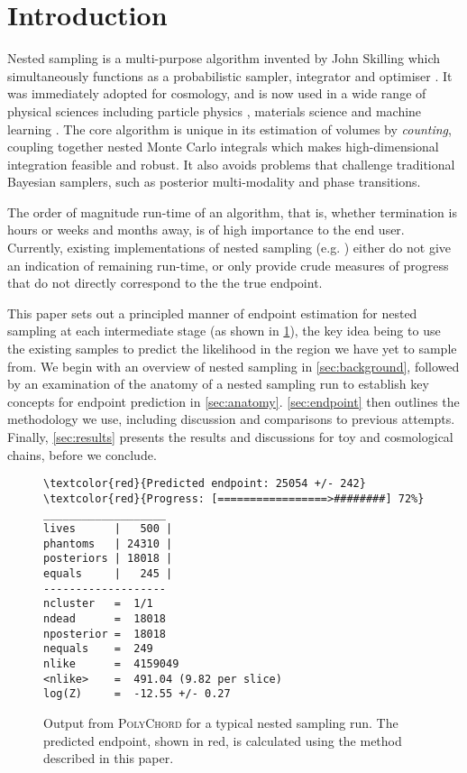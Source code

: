 \documentclass[usenatbib]{mnras}
\begin{document}
\section{Introduction}
Nested sampling is a multi-purpose algorithm invented by John Skilling which simultaneously functions as a probabilistic sampler, integrator and optimiser \citep{skilling}. It was immediately adopted for cosmology, and is now used in a wide range of physical sciences including particle physics \citep{Trotta_2008}, materials science \citep{materials} and machine learning \citep{sparse_reconstruction}. The core algorithm is unique in its estimation of volumes by \textit{counting}, coupling together nested Monte Carlo integrals which makes high-dimensional integration feasible and robust. It also avoids problems that challenge traditional Bayesian samplers, such as posterior multi-modality and phase transitions.
\par
The order of magnitude run-time of an algorithm, that is, whether termination is hours or weeks and months away, is of high importance to the end user. Currently, existing implementations of nested sampling (e.g. \citealt{multinest, polychord, dnest, dynesty, ultranest, nessai,proxnest}) either do not give an indication of remaining run-time, or only provide crude measures of progress that do not directly correspond to the the true endpoint.
\par
This paper sets out a principled manner of endpoint estimation for nested sampling at each intermediate stage (as shown in \cref{fig:polychord_output}), the key idea being to use the existing samples to predict the likelihood in the region we have yet to sample from. We begin with an overview of nested sampling in \cref{sec:background}, followed by an examination of the anatomy of a nested sampling run to establish key concepts for endpoint prediction in \cref{sec:anatomy}. \cref{sec:endpoint} then outlines the methodology we use, including discussion and comparisons to previous attempts. Finally, \cref{sec:results} presents the results and discussions for toy and cosmological chains, before we conclude.
\begin{figure}
\begin{Verbatim}[frame=single, commandchars=\\\{\}]
\textcolor{red}{Predicted endpoint: 25054 +/- 242}
\textcolor{red}{Progress: [=================>########] 72%}
___________________
lives      |   500 |
phantoms   | 24310 |
posteriors | 18018 |
equals     |   245 |
-------------------
ncluster   =  1/1
ndead      =  18018
nposterior =  18018
nequals    =  249
nlike      =  4159049
<nlike>    =  491.04 (9.82 per slice)
log(Z)     =  -12.55 +/- 0.27
\end{Verbatim}
\caption{Output from \textsc{PolyChord} for a typical nested sampling run. The predicted endpoint, shown in red, is calculated using the method described in this paper.}
\label{fig:polychord_output}
\end{figure}
\end{document}
